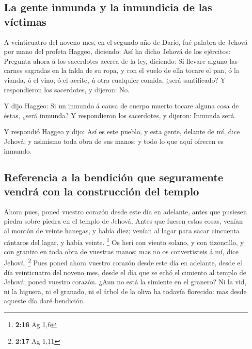 \hypertarget{la-gente-inmunda-y-la-inmundicia-de-las-vuxedctimas}{%
\subsection{La gente inmunda y la inmundicia de las
víctimas}\label{la-gente-inmunda-y-la-inmundicia-de-las-vuxedctimas}}

 A veinticuatro del noveno mes, en el segundo año de
Darío, fué palabra de Jehová por mano del profeta Haggeo, diciendo:
 Así ha dicho Jehová de los ejércitos: Pregunta ahora á
los sacerdotes acerca de la ley, diciendo:  Si llevare
alguno las carnes sagradas en la falda de su ropa, y con el vuelo de
ella tocare el pan, ó la vianda, ó el vino, ó el aceite, ú otra
cualquier comida, ¿será santificado? Y respondieron los sacerdotes, y
dijeron: No.~

 Y dijo Haggeo: Si un inmundo á causa de cuerpo muerto
tocare alguna cosa de éstas, ¿será inmunda? Y respondieron los
sacerdotes, y dijeron: Inmunda será.

 Y respondió Haggeo y dijo: Así es este pueblo, y esta
gente, delante de mí, dice Jehová; y asimismo toda obra de sus manos; y
todo lo que aquí ofrecen es inmundo.

\hypertarget{referencia-a-la-bendiciuxf3n-que-seguramente-vendruxe1-con-la-construcciuxf3n-del-templo}{%
\subsection{Referencia a la bendición que seguramente vendrá con la
construcción del
templo}\label{referencia-a-la-bendiciuxf3n-que-seguramente-vendruxe1-con-la-construcciuxf3n-del-templo}}

 Ahora pues, poned vuestro corazón desde este día en
adelante, antes que pusiesen piedra sobre piedra en el templo de Jehová,
 Antes que fuesen estas cosas, venían al montón de veinte
hanegas, y había diez; venían al lagar para sacar cincuenta cántaros del
lagar, y había veinte. \footnote{\textbf{2:16} Ag 1,6} 
Os herí con viento solano, y con tizoncillo, y con granizo en toda obra
de vuestras manos; mas no os convertisteis á mí, dice Jehová.
\footnote{\textbf{2:17} Ag 1,11}  Pues poned ahora
vuestro corazón desde este día en adelante, desde el día veinticuatro
del noveno mes, desde el día que se echó el cimiento al templo de
Jehová; poned vuestro corazón.  ¿Aun no está la simiente
en el granero? Ni la vid, ni la higuera, ni el granado, ni el árbol de
la oliva ha todavía florecido: mas desde aqueste día daré bendición.

